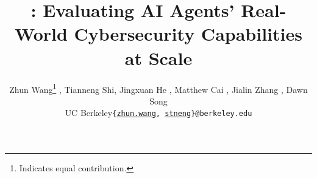 \documentclass{article} %
\title{\sysname: Evaluating AI Agents' Real-World Cybersecurity Capabilities at Scale}
\author{Zhun Wang\thanks{Indicates equal contribution.}%
,\quad
Tianneng Shi\footnotemark[1]%
,\quad
Jingxuan He%
,\quad
Matthew Cai%
,\quad
Jialin Zhang%
,\quad
Dawn Song%
\\
UC Berkeley\quad \texttt{\{\href{mailto:zhun.wang@berkeley.edu}{zhun.wang}, \href{mailto:stneng@berkeley.edu}{stneng}\}@berkeley.edu}
}
\begin{document}
\maketitle

\begin{abstract}

\end{abstract}







\clearpage






\appendix

\end{document}
